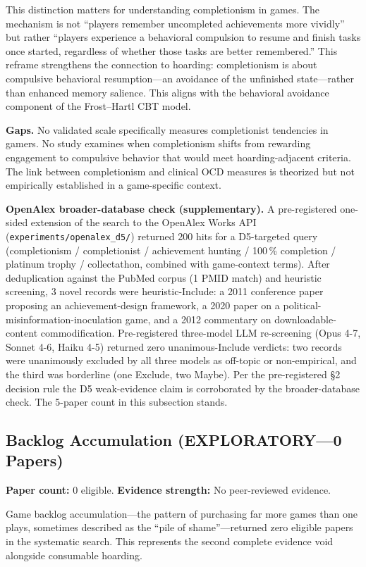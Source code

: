 \documentclass[12pt]{article}
\begin{document}
This distinction matters for understanding completionism in games. The mechanism is not ``players remember uncompleted achievements more vividly'' but rather ``players experience a behavioral compulsion to resume and finish tasks once started, regardless of whether those tasks are better remembered.'' This reframe strengthens the connection to hoarding: completionism is about compulsive behavioral resumption---an avoidance of the unfinished state---rather than enhanced memory salience. This aligns with the behavioral avoidance component of the Frost--Hartl CBT model.

\textbf{Gaps.} No validated scale specifically measures completionist tendencies in gamers. No study examines when completionism shifts from rewarding engagement to compulsive behavior that would meet hoarding-adjacent criteria. The link between completionism and clinical OCD measures is theorized but not empirically established in a game-specific context.

\textbf{OpenAlex broader-database check (supplementary).} A pre-registered one-sided extension of the search to the OpenAlex Works API (\texttt{experiments/openalex\_d5/}) returned 200 hits for a D5-targeted query (completionism / completionist / achievement hunting / 100\,\% completion / platinum trophy / collectathon, combined with game-context terms). After deduplication against the PubMed corpus (1 PMID match) and heuristic screening, 3 novel records were heuristic-Include: a 2011 conference paper proposing an achievement-design framework, a 2020 paper on a political-misinformation-inoculation game, and a 2012 commentary on downloadable-content commodification. Pre-registered three-model LLM re-screening (Opus 4-7, Sonnet 4-6, Haiku 4-5) returned zero unanimous-Include verdicts: two records were unanimously excluded by all three models as off-topic or non-empirical, and the third was borderline (one Exclude, two Maybe). Per the pre-registered §2 decision rule the D5 weak-evidence claim is corroborated by the broader-database check. The 5-paper count in this subsection stands.

\subsection{Backlog Accumulation (EXPLORATORY---0 Papers)}

\textbf{Paper count:} 0 eligible. \textbf{Evidence strength:} No peer-reviewed evidence.

Game backlog accumulation---the pattern of purchasing far more games than one plays, sometimes described as the ``pile of shame''---returned zero eligible papers in the systematic search. This represents the second complete evidence void alongside consumable hoarding.
\end{document}
